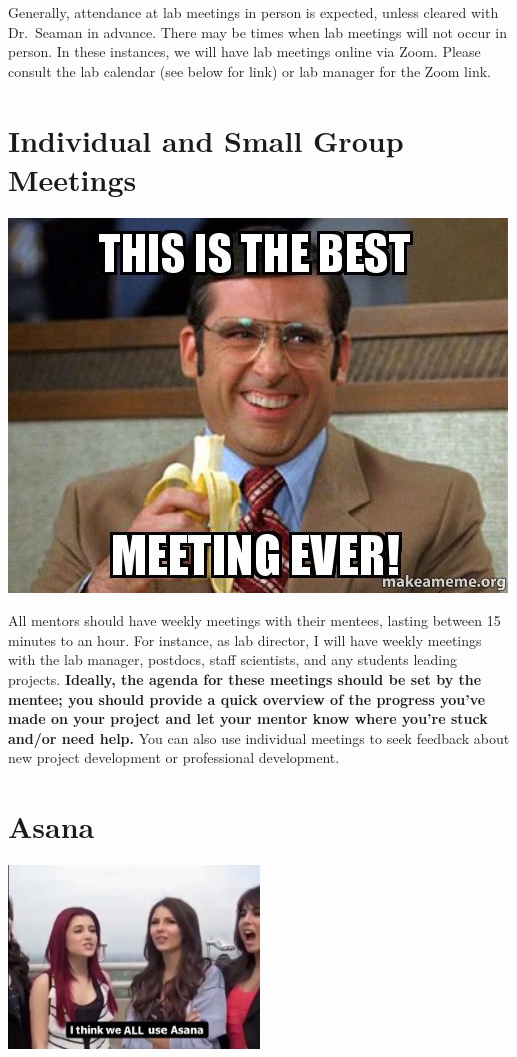 \documentclass[
]{book}
\begin{document}
Generally, attendance at lab meetings in person is expected, unless cleared with Dr.~Seaman in advance. There may be times when lab meetings will not occur in person. In these instances, we will have lab meetings online via Zoom. Please consult the lab calendar (see below for link) or lab manager for the Zoom link.

\hypertarget{individual-and-small-group-meetings}{%
\section{Individual and Small Group Meetings}\label{individual-and-small-group-meetings}}

\includegraphics{images/best_meeting.jpg}

All mentors should have weekly meetings with their mentees, lasting between 15 minutes to an hour. For instance, as lab director, I will have weekly meetings with the lab manager, postdocs, staff scientists, and any students leading projects. \textbf{Ideally, the agenda for these meetings should be set by the mentee; you should provide a quick overview of the progress you've made on your project and let your mentor know where you're stuck and/or need help.} You can also use individual meetings to seek feedback about new project development or professional development.

\hypertarget{asana}{%
\section{Asana}\label{asana}}

\includegraphics[width=0.5\textwidth,height=\textheight]{images/i_think_we_all.jpg}
\end{document}
